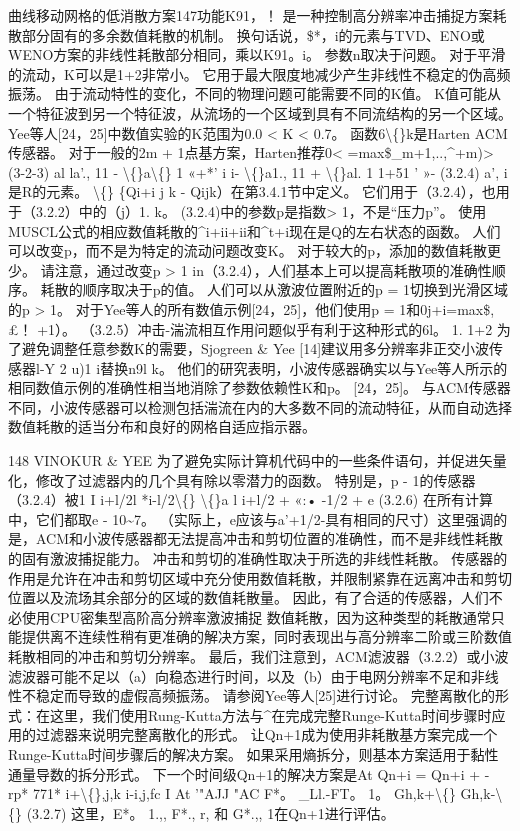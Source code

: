 \documentclass[UTF8,11pt,a4paper,openany,fontset=fandol]{ctexbook}
\begin{document}
曲线移动网格的低消散方案147功能K91，！ 是一种控制高分辨率冲击捕捉方案耗散部分固有的多余数值耗散的机制。 换句话说，\$*，i的元素与TVD、ENO或WENO方案的非线性耗散部分相同，乘以K91。i。 参数n取决于问题。 对于平滑的流动，K可以是1+2非常小。 它用于最大限度地减少产生非线性不稳定的伪高频振荡。 由于流动特性的变化，不同的物理问题可能需要不同的K值。 K值可能从一个特征波到另一个特征波，从流场的一个区域到具有不同流结构的另一个区域。 Yee等人[24，25]中数值实验的K范围为0.0 < K < 0.7。 函数6\textbackslash\{\}k是Harten ACM传感器。 对于一般的2m + 1点基方案，Harten推荐0< =max\$\_m+1,..,\textasciicircum{}+m)> (3-2-3) al la'., 11 - \textbackslash\{\}a\textbackslash\{\} 1 «+*' i i- \textbackslash\{\}a1., 11 + \textbackslash\{\}al. 1 1+51 ' »- (3.2.4) a', i是R的元素。 \textbackslash\{\} \{Qi+i j k - Qijk）在第3.4.1节中定义。 它们用于（3.2.4），也用于（3.2.2）中的（j）1. k。 (3.2.4)中的参数p是指数> 1，不是“压力p”。 使用MUSCL公式的相应数值耗散的\textasciicircum{}i+ii+ii和\textasciicircum{}t+i现在是Q的左右状态的函数。 人们可以改变p，而不是为特定的流动问题改变K。 对于较大的p，添加的数值耗散更少。 请注意，通过改变p > 1 in（3.2.4），人们基本上可以提高耗散项的准确性顺序。 耗散的顺序取决于p的值。 人们可以从激波位置附近的p = 1切换到光滑区域的p > 1。 对于Yee等人的所有数值示例[24，25]，他们使用p = 1和0j+i=max\$,£！ +1）。 （3.2.5）冲击-湍流相互作用问题似乎有利于这种形式的6l。 1. 1+2 为了避免调整任意参数K的需要，Sjogreen \& Yee [14]建议用多分辨率非正交小波传感器l-Y 2 u)1 i替换n9l k。 他们的研究表明，小波传感器确实以与Yee等人所示的相同数值示例的准确性相当地消除了参数依赖性K和p。 [24，25]。 与ACM传感器不同，小波传感器可以检测包括湍流在内的大多数不同的流动特征，从而自动选择数值耗散的适当分布和良好的网格自适应指示器。

148 VINOKUR \& YEE 为了避免实际计算机代码中的一些条件语句，并促进矢量化，修改了过滤器内的几个具有除以零潜力的函数。 特别是，p - 1的传感器（3.2.4）被1 I i+l/2l *i-l/2\textbackslash\{\} \textbackslash\{\}a l i+l/2 + «:• -1/2 + e (3.2.6) 在所有计算中，它们都取e - 10\textasciitilde{}7。 （实际上，e应该与a'+1/2-具有相同的尺寸）这里强调的是，ACM和小波传感器都无法提高冲击和剪切位置的准确性，而不是非线性耗散的固有激波捕捉能力。 冲击和剪切的准确性取决于所选的非线性耗散。 传感器的作用是允许在冲击和剪切区域中充分使用数值耗散，并限制紧靠在远离冲击和剪切位置以及流场其余部分的区域的数值耗散量。 因此，有了合适的传感器，人们不必使用CPU密集型高阶高分辨率激波捕捉 数值耗散，因为这种类型的耗散通常只能提供离不连续性稍有更准确的解决方案，同时表现出与高分辨率二阶或三阶数值耗散相同的冲击和剪切分辨率。 最后，我们注意到，ACM滤波器（3.2.2）或小波滤波器可能不足以（a）向稳态进行时间，以及（b）由于电网分辨率不足和非线性不稳定而导致的虚假高频振荡。 请参阅Yee等人[25]进行讨论。 完整离散化的形式：在这里，我们使用Rung-Kutta方法与\textasciicircum{}在完成完整Runge-Kutta时间步骤时应用的过滤器来说明完整离散化的形式。 让Qn+1成为使用非耗散基方案完成一个Runge-Kutta时间步骤后的解决方案。 如果采用熵拆分，则基本方案适用于黏性通量导数的拆分形式。 下一个时间级Qn+1的解决方案是At Qn+i = Qn+i + - rp* 771* i+\textbackslash\{\},j,k i-i,j,fc I At '"AJJ "AC F*。 \_Ll.-FT。 1。 Gh,k+\textbackslash\{\} Gh,k-\textbackslash\{\} (3.2.7) 这里，E*。 1.,, F*., r, 和 G*.,, 1在Qn+1进行评估。
\end{document}
